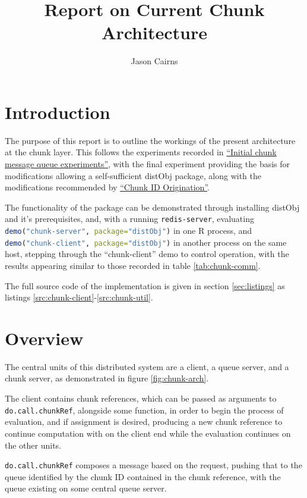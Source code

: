 \documentclass[a4paper,10pt]{article}
\begin{document}
\title{Report on Current Chunk Architecture}
\author{Jason Cairns}
  
\maketitle

\section{Introduction}

The purpose of this report is to outline the workings of the present
architecture at the chunk layer.
This follows the experiments recorded in
\href{init-chunk-msg-q-exp.pdf}{``Initial chunk message queue experiments''},
with the final experiment providing the basis for modifications allowing a
self-sufficient distObj package, along with the modifications recommended by
\href{chunk-id-orig.pdf}{``Chunk ID Origination''}.

The functionality of the package can be demonstrated through installing distObj
and it's prerequisites, and, with a running \texttt{redis-server}, evaluating
\lstinline[language=R]{demo("chunk-server", package="distObj")} in one R
process, and \lstinline[language=R]{demo("chunk-client", package="distObj")} in
another process on the same host, stepping through the ``chunk-client'' demo to
control operation, with the results appearing similar to those recorded in
table \ref{tab:chunk-comm}.

The full source code of the implementation is given in section
\ref{sec:listings} as listings \ref{src:chunk-client}-\ref{src:chunk-util}.

\section{Overview}

The central units of this distributed system are a client, a queue server, and
a chunk server, as demonstrated in figure \ref{fig:chunk-arch}.

The client contains chunk references, which can be passed as arguments to
\texttt{do.call.chunkRef}, alongside some function, in order to begin the
process of evaluation, and if assignment is desired, producing a new chunk
reference to continue computation with on the client end while the evaluation
continues on the other units.

\texttt{do.call.chunkRef} composes a message based on the request, pushing that
to the queue identified by the chunk ID contained in the chunk reference, with
the queue existing on some central queue server.
\end{document}

